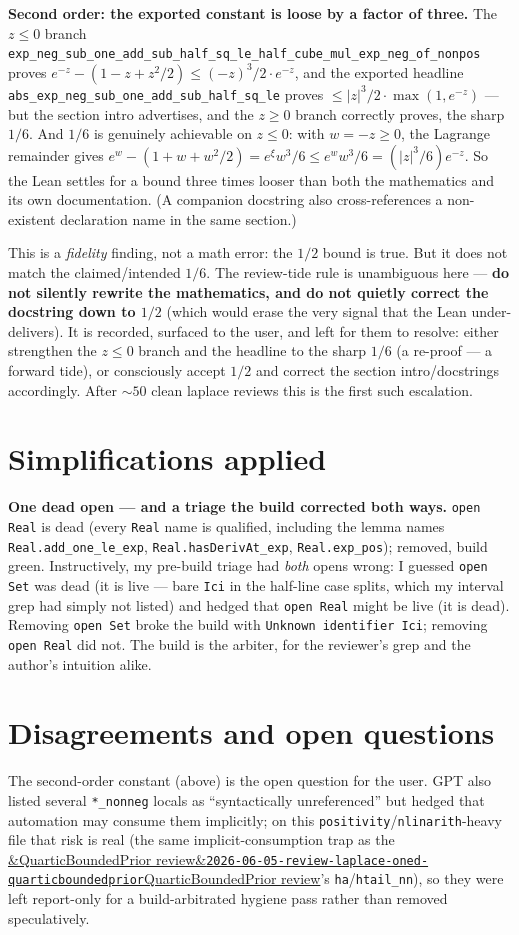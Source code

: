\documentclass[11pt]{article}
\newcommand{\reviewref}[2][]{\href{https://therisensea.org/reviews/#2/}{\ifx&#1&\texttt{#2}\else#1\fi}}
\begin{document}
\textbf{Second order: the exported constant is loose by a factor of three.} The $z\le0$ branch
\texttt{exp\_neg\_sub\_one\_add\_sub\_half\_sq\_le\_half\_cube\_mul\_exp\_neg\_of\_nonpos} proves
$e^{-z}-(1-z+z^2/2)\le(-z)^3/2\cdot e^{-z}$, and the exported headline
\texttt{abs\_exp\_neg\_sub\_one\_add\_sub\_half\_sq\_le} proves $\le|z|^3/2\cdot\max(1,e^{-z})$ --- but
the section intro advertises, and the $z\ge0$ branch correctly proves, the sharp $1/6$. And $1/6$ is
genuinely achievable on $z\le0$: with $w=-z\ge0$, the Lagrange remainder gives
$e^{w}-(1+w+w^2/2)=e^{\xi}w^3/6\le e^{w}w^3/6=(|z|^3/6)e^{-z}$. So the Lean settles for a bound three
times looser than both the mathematics and its own documentation. (A companion docstring also
cross-references a non-existent declaration name in the same section.)

This is a \emph{fidelity} finding, not a math error: the $1/2$ bound is true. But it does not match the
claimed/intended $1/6$. The review-tide rule is unambiguous here --- \textbf{do not silently rewrite
the mathematics, and do not quietly correct the docstring down to $1/2$} (which would erase the very
signal that the Lean under-delivers). It is recorded, surfaced to the user, and left for them to
resolve: either strengthen the $z\le0$ branch and the headline to the sharp $1/6$ (a re-proof --- a
forward tide), or consciously accept $1/2$ and correct the section intro/docstrings accordingly. After
$\sim 50$ clean laplace reviews this is the first such escalation.

\section{Simplifications applied}
\textbf{One dead open --- and a triage the build corrected both ways.} \texttt{open Real} is dead
(every \texttt{Real} name is qualified, including the lemma names \texttt{Real.add\_one\_le\_exp},
\texttt{Real.hasDerivAt\_exp}, \texttt{Real.exp\_pos}); removed, build green. Instructively, my
pre-build triage had \emph{both} opens wrong: I guessed \texttt{open Set} was dead (it is live --- bare
\texttt{Ici} in the half-line case splits, which my interval grep had simply not listed) and hedged
that \texttt{open Real} might be live (it is dead). Removing \texttt{open Set} broke the build with
\texttt{Unknown identifier Ici}; removing \texttt{open Real} did not. The build is the arbiter, for the
reviewer's grep and the author's intuition alike.

\section{Disagreements and open questions}
The second-order constant (above) is the open question for the user. GPT also listed several
\texttt{*\_nonneg} locals as ``syntactically unreferenced'' but hedged that automation may consume
them implicitly; on this \texttt{positivity}/\texttt{nlinarith}-heavy file that risk is real (the same
implicit-consumption trap as the \reviewref[QuarticBoundedPrior review]{2026-06-05-review-laplace-oned-quarticboundedprior}'s
\texttt{ha}/\texttt{htail\_nn}), so they were left report-only for a build-arbitrated hygiene pass
rather than removed speculatively.
\end{document}
